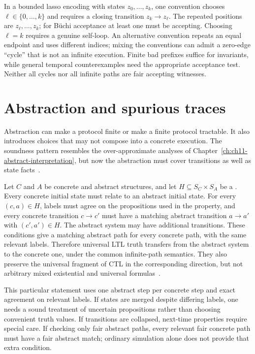 In a bounded lasso encoding with states $z_0,\ldots,z_k$, one convention chooses $\ell\in\{0,\ldots,k\}$ and requires a closing transition $z_k\to z_\ell$.
The repeated positions are $z_\ell,\ldots,z_k$; for B\"uchi acceptance at least one must be accepting.
Choosing $\ell=k$ requires a genuine self-loop.
An alternative convention repeats an equal endpoint and uses different indices; mixing the conventions can admit a zero-edge \enquote{cycle} that is not an infinite execution.
Finite bad prefixes suffice for invariants, while general temporal counterexamples need the appropriate acceptance test.
Neither all cycles nor all infinite paths are fair accepting witnesses.

\section{Abstraction and spurious traces}
\label{sec:ch46-abstraction}

Abstraction can make a protocol finite or make a finite protocol tractable.
It also introduces choices that may not compose into a concrete execution.
The soundness pattern resembles the over-approximate analyses of Chapter~\ref{ch:ch11-abstract-interpretation}, but now the abstraction must cover transitions as well as state facts~\cite{cousot-1977-abstract}.

Let $C$ and $A$ be concrete and abstract structures, and let $H\subseteq S_C\times S_A$ be a .
Every concrete initial state must relate to an abstract initial state.
For every $(c,a)\in H$, labels must agree on the propositions used in the property, and every concrete transition $c\to c'$ must have a matching abstract transition $a\to a'$ with $(c',a')\in H$.
The abstract system may have additional transitions.
These conditions give a matching abstract path for every concrete path, with the same relevant labels.
Therefore universal LTL truth transfers from the abstract system to the concrete one, under the common infinite-path semantics.
They also preserve the universal fragment of CTL in the corresponding direction, but not arbitrary mixed existential and universal formulas~\cite{baier-2008-model-checking}.

This particular statement uses one abstract step per concrete step and exact agreement on relevant labels.
If states are merged despite differing labels, one needs a sound treatment of uncertain propositions rather than choosing convenient truth values.
If transitions are collapsed, next-time properties require special care.
If checking only fair abstract paths, every relevant fair concrete path must have a fair abstract match; ordinary simulation alone does not provide that extra condition.


